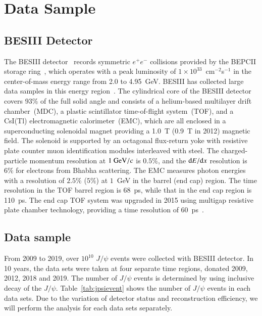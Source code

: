 \section{Data Sample}

\subsection{BESIII Detector}
The BESIII detector~\cite{Ablikim:2009aa} records symmetric $e^+e^-$ collisions
provided by the BEPCII storage ring~\cite{Yu:IPAC2016-TUYA01}, which operates with a peak luminosity of $1\times10^{33}$~cm$^{-2}$s$^{-1}$
in the center-of-mass energy range from 2.0 to  4.95~GeV.
BESIII has collected large data samples in this energy region~\cite{Ablikim:2019hff}. The cylindrical core of the BESIII detector covers 93\% of the full solid angle and consists of a helium-based
 multilayer drift chamber~(MDC), a plastic scintillator time-of-flight
system~(TOF), and a CsI(Tl) electromagnetic calorimeter~(EMC),
which are all enclosed in a superconducting solenoidal magnet
providing a 1.0~T  (0.9~T in
2012) magnetic field. The solenoid is supported by an
octagonal flux-return yoke with resistive plate counter muon
identification modules interleaved with steel.
The charged-particle momentum resolution at $1~{\rm GeV}/c$ is
$0.5\%$, and the
${\rm d}E/{\rm d}x$
resolution is $6\%$ for electrons
from Bhabha scattering. The EMC measures photon energies with a
resolution of $2.5\%$ ($5\%$) at $1$~GeV in the barrel (end cap)
region. The time resolution in the TOF barrel region is 68~ps, while
that in the end cap region is 110~ps.  The end cap TOF
system was upgraded in 2015 using multigap resistive plate chamber
technology, providing a time resolution of
60~ps~\cite{etof}.


\subsection{Data sample}
From 2009 to 2019, over $10^{10}$ $J/\psi$ events were collected with BESIII detector. 
In 10 years, the data sets were taken at four separate time regions, donated 2009, 2012,
2018 and 2019.
The number of $J/\psi$ events is determined by using inclusive decay of the $J/\psi$.
Table~\ref{tab:jpsievent} shows the number of $J/\psi$ events in each data sets. Due to the variation of 
detector status and reconstruction efficiency, we will perform the analysis for each data 
sets separately.

